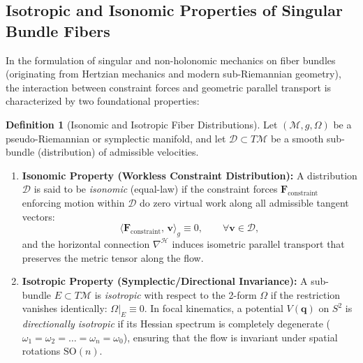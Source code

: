 \documentclass[11pt,a4paper,reqno]{article}
\theoremstyle{plain}
\theoremstyle{definition}
\newtheorem{definition}[theorem]{Definition}
\theoremstyle{remark}
\numberwithin{equation}{section}
\numberwithin{table}{section}
\begin{document}
\subsection{Isotropic and Isonomic Properties of Singular Bundle Fibers}
\label{subsec:isotropic_isonomic_fibers}

In the formulation of singular and non-holonomic mechanics on fiber bundles (originating from Hertzian mechanics and modern sub-Riemannian geometry), the interaction between constraint forces and geometric parallel transport is characterized by two foundational properties:
\begin{definition}[Isonomic and Isotropic Fiber Distributions]
\label{def:isonomic_isotropic}
Let $(\mathcal{M}, g, \Omega)$ be a pseudo-Riemannian or symplectic manifold, and let $\mathcal{D} \subset T\mathcal{M}$ be a smooth sub-bundle (distribution) of admissible velocities.
\begin{enumerate}[label=(\alph*)]
  \item \textbf{Isonomic Property (Workless Constraint Distribution):} A distribution $\mathcal{D}$ is said to be \emph{isonomic} (equal-law) if the constraint forces $\bm{F}_{\mathrm{constraint}}$ enforcing motion within $\mathcal{D}$ do zero virtual work along all admissible tangent vectors:
  \begin{equation}
    \langle \bm{F}_{\mathrm{constraint}}, \, \bm{v} \rangle_g \equiv 0, \qquad \forall \bm{v} \in \mathcal{D},
    \label{eq:isonomic_workless_def}
  \end{equation}
  and the horizontal connection $\nabla^{\mathcal{H}}$ induces isometric parallel transport that preserves the metric tensor along the flow.
  \item \textbf{Isotropic Property (Symplectic/Directional Invariance):} A sub-bundle $E \subset T\mathcal{M}$ is \emph{isotropic} with respect to the 2-form $\Omega$ if the restriction vanishes identically: $\left.\Omega\right|_E \equiv 0$. In focal kinematics, a potential $V(\bm{q})$ on $S^2$ is \emph{directionally isotropic} if its Hessian spectrum is completely degenerate ($\omega_1 = \omega_2 = \dots = \omega_n = \omega_0$), ensuring that the flow is invariant under spatial rotations $\mathrm{SO}(n)$.
\end{enumerate}
\end{definition}
\end{document}
